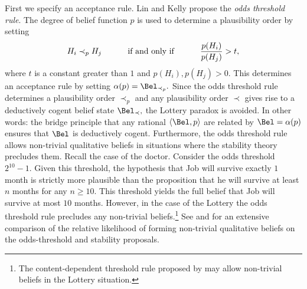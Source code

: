 First we  specify an acceptance rule. Lin and Kelly propose the {\em odds
threshold rule}. The  degree of belief function $p$ is used to determine a
plausibility order by setting $$H_i \prec_p H_j \text{\hspace{10mm} if and only
if \hspace{10mm}} \frac{p(H_i)}{p(H_j)} > t,$$ where $t$ is a constant greater
than $1$ and $p(H_i),p(H_j)>0$. This determines an acceptance rule by setting
$\alpha(p)= \Bel_{\prec_p}.$ Since the odds threshold rule determines a
plausibility order $\prec_p$ and any plausibility order $\prec$  gives rise to a
deductively cogent belief state $\Bel_\prec,$ the Lottery paradox is avoided. In
other words: the bridge principle that any rational $\langle \Bel,p \rangle$
are related by $\Bel=\alpha(p)$ ensures that $\Bel$ is deductively cogent.
Furthermore, the odds threshold rule allows non-trivial qualitative beliefs in
situations where the stability theory precludes them. Recall the case of the
doctor. Consider the odds threshold $2^{10} -1$. Given this threshold, the
hypothesis that Job will survive exactly $1$ month is strictly more plausible
than the proposition that he will survive at least $n$ months for any $n\geq
10$. This threshold yields the full belief that Job will survive at most $10$
months. However, in the case of the Lottery the odds threshold rule precludes
any non-trivial beliefs.\footnote{The content-dependent threshold rule proposed
by \citet{lin2019correspondence} may allow non-trivial beliefs in the Lottery
situation.} See \citet{rott2017stability} and  \citet{douven2018probabilities}
for an extensive comparison of the relative likelihood of forming non-trivial
qualitative beliefs on the odds-threshold and stability proposals. 

